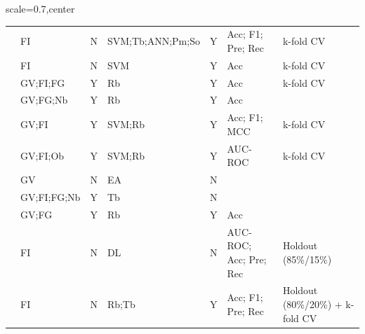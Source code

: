 \begin{landscape}
\begin{table}[!th]
\begin{adjustbox}{scale=0.7,center}
\begin{tabular}{llclcll}
\citet{U2014}             & FI             & N                                    & SVM;Tb;ANN;Pm;So & Y                                     & Acc; F1; Pre; Rec     & k-fold CV                       \\
\citet{Anoosha2015}       & FI          & N                                    & SVM             & Y                                     & Acc                             & k-fold CV                       \\
\citet{Gnad2015}          & GV;FI;FG       & Y                                    & Rb              & Y                                     & Acc                             & k-fold CV                       \\
\citet{Park2015}          & GV;FG;Nb       & Y                                    & Rb              & Y                                     & Acc                             &                                 \\
\citet{Soliman2015}       & GV;FI             & Y                                    & SVM;Rb          & Y                                     & Acc; F1; MCC                         & k-fold CV                       \\
\citet{Dong2016}          & GV;FI;Ob       & Y                                    & SVM;Rb          & Y                                     & AUC-ROC                             & k-fold CV                       \\
\citet{LI2016}            & GV             & N                                    & EA              & N                                     &                                 &                                 \\
\citet{Tokheim2016}       & GV;FI;FG;Nb       & Y                                    & Tb              & N                                     &                             &                                 \\
\citet{Park2017}          & GV;FG          & Y                                    & Rb              & Y                                     & Acc                             &                                 \\
\citet{Tavanaei2017}      & FI             & N                                    & DL              & N                                     & AUC-ROC; Acc; Pre; Rec     & Holdout (85\%/15\%)             \\
\citet{Agajanian2018}     & FI          & N                                    & Rb;Tb           & Y                                     & Acc; F1; Pre; Rec      & Holdout (80\%/20\%) + k-fold CV \\

\end{tabular}
\end{adjustbox}
\end{table}
\end{landscape}
